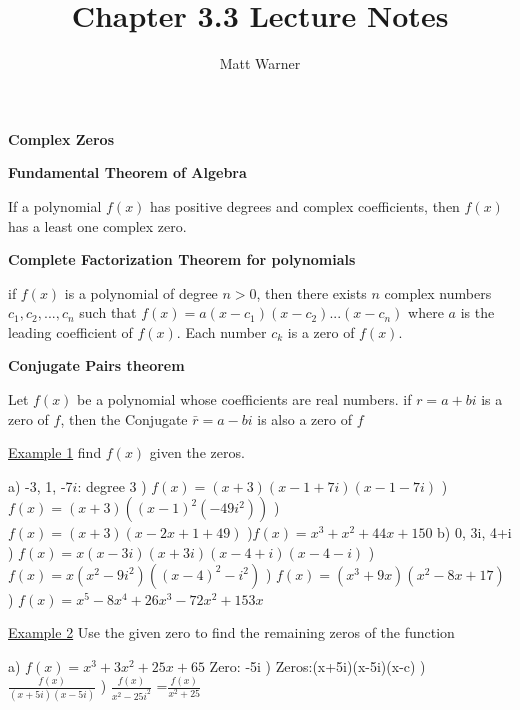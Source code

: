 \documentclass{report}
\title{\Huge{Chapter 3.3 Lecture Notes}}
\author{\huge{Matt Warner}}
\begin{document}
  \maketitle

  \begin{huge}
    \noindent \textbf{Complex Zeros}
  \end{huge}

  \bigbreak \bigbreak 

  \begin{large}
   \noindent \textbf{Fundamental Theorem of Algebra}
  \end{large}

  \bigbreak

  \noindent If a polynomial $f(x)$ has positive degrees and complex coefficients, then $f(x)$ has a least one complex zero.
  \bigbreak \bigbreak
  \begin{large}

    \noindent \textbf{Complete Factorization Theorem for polynomials}

  \end{large}

  \bigbreak
  \noindent if $f(x)$ is a polynomial of degree $n>0$, then there exists $n$ complex numbers $c_1,c_2,...,c_n$ such that $f(x)=a(x-c_1)(x-c_2)...(x-c_n)$ where $a$ is the leading coefficient of $f(x)$. Each number $c_k$ is a zero of $f(x)$.
  \bigbreak \bigbreak
  \begin{large}
    \noindent \textbf{Conjugate Pairs theorem}
  \end{large}
  \bigbreak
  \noindent Let $f(x)$ be a polynomial whose coefficients are real numbers. if $r=a+bi$ is a zero of $f$, then the Conjugate $\bar{r} = a-bi$ is also a zero of $f$
  \bigbreak \bigbreak
  \begin{large}
  \noindent \underline{Example 1}
  find $f(x)$ given the zeros.
    
  \end{large}

  \bigbreak
  \noindent a) -3, 1, -7$i$: degree 3
  ) $f(x)=(x+3)(x-1+7i)(x-1-7i)$
  ) $f(x)=(x+3)((x-1)^2(-49i^2))$
  ) $f(x) = (x+3)(x-2x+1 + 49)$
  )\textbf{$f(x)=x^3+x^2+44x+150$}
  \bigbreak \bigbreak
  \noindent b) 0, 3i, 4+i
  ) $f(x)= x(x-3i)(x+3i)(x-4+i)(x-4-i)$
  ) $f(x)= x(x^2-9i^2)((x-4)^2-i^2)$
  ) $f(x)= (x^3+9x)(x^2-8x+17)$
  ) $f(x)= x^5-8x^4+26x^3-72x^2+153x$
  \bigbreak \bigbreak
  \begin{large}
    \noindent \underline{Example 2}
    Use the given zero to find the remaining zeros of the function
    
  \end{large}
  \bigbreak
  \noindent a) $f(x)= x^3+3x^2+25x+65$
  \bigbreak
  \noindent Zero: -5i
  ) Zeros:(x+5i)(x-5i)(x-c)
   ) $\frac{f(x)}{(x+5i)(x-5i)}$
   ) $\frac{f(x)}{x^2-25i^2}$
  \bigbreak 
   =$\frac{f(x)}{x^2+25}$
\end{document}
